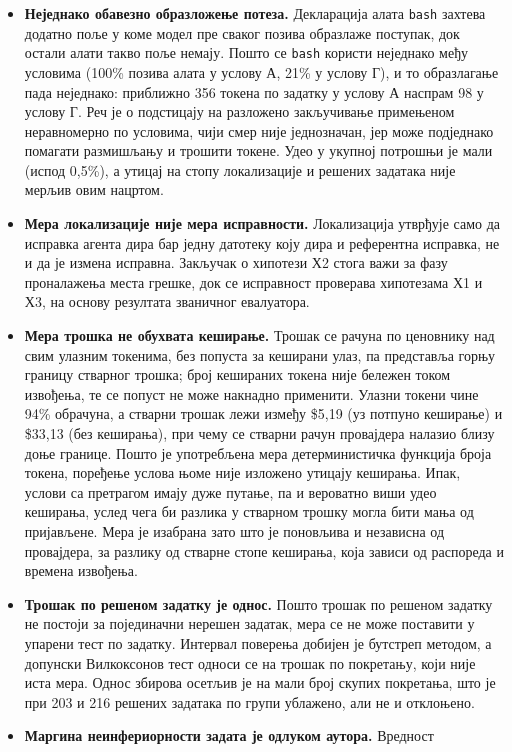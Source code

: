 \documentclass[12pt,a4paper]{report}
\begin{document}
\begin{itemize}
		\item \textbf{Неједнако обавезно образложење потеза.} Декларација алата
		\texttt{bash} захтева додатно поље у коме модел пре сваког позива
		образлаже поступак, док остали алати такво поље немају. Пошто се
		\texttt{bash} користи неједнако међу условима (100\% позива алата у услову А,
		21\% у услову Г), и то образлагање пада неједнако: приближно 356 токена
		по задатку у услову А наспрам 98 у услову Г. Реч је о подстицају на
		разложено закључивање примењеном неравномерно по условима, чији смер није
		једнозначан, јер може подједнако помагати размишљању и трошити токене.
		Удео у укупној потрошњи је мали (испод 0,5\%), а утицај на стопу
		локализације и решених задатака није мерљив овим нацртом.
		\item \textbf{Мера локализације није мера исправности.} Локализација
		утврђује само да исправка агента дира бар једну датотеку коју дира и
		референтна исправка, не и да је измена исправна. Закључак о хипотези Х2
		стога важи за фазу проналажења места грешке, док се исправност проверава
		хипотезама Х1 и Х3, на основу резултата званичног евалуатора.
		\item \textbf{Мера трошка не обухвата кеширање.} Трошак се рачуна по
		ценовнику над свим улазним токенима, без попуста за кеширани улаз, па
		представља горњу границу стварног трошка; број кешираних токена није
		бележен током извођења, те се попуст не може накнадно применити. Улазни
		токени чине 94\% обрачуна, а стварни трошак лежи између \$5,19 (уз
		потпуно кеширање) и \$33,13 (без кеширања), при чему се стварни рачун
		провајдера налазио близу доње границе. Пошто је употребљена мера
		детерминистичка функција броја токена, поређење услова њоме није
		изложено утицају кеширања. Ипак, услови са претрагом имају дуже путање,
		па и вероватно виши удео кеширања, услед чега би разлика у стварном
		трошку могла бити мања од пријављене. Мера је изабрана зато што је
		поновљива и независна од провајдера, за разлику од стварне стопе
		кеширања, која зависи од распореда и времена извођења.
		\item \textbf{Трошак по решеном задатку је однос.} Пошто трошак по
		решеном задатку не постоји за појединачни нерешен задатак, мера се не
		може поставити у упарени тест по задатку. Интервал поверења добијен је
		бутстреп методом, а допунски Вилкоксонов тест односи се на трошак по
		покретању, који није иста мера. Однос збирова осетљив је на мали број
		скупих покретања, што је при 203 и 216 решених задатака по групи
		ублажено, али не и отклоњено.
		\item \textbf{Маргина неинфериорности задата је одлуком аутора.} Вредност

\end{itemize}
\end{document}
